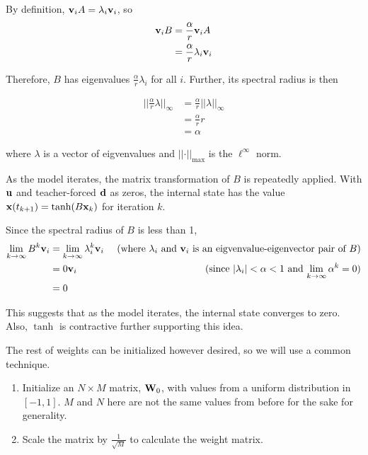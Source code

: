\documentclass{article}
\begin{document}
By definition, $\mathbf{v}_i A = \lambda_i \mathbf{v}_i$, so
\begin{align*}
   \mathbf{v}_i B &= \frac{\alpha}{r} \mathbf{v}_i A \\
   &= \frac{\alpha}{r} \lambda_i \mathbf{v}_i
\end{align*}

Therefore, $B$ has eigenvalues $\frac{\alpha}{r} \lambda_i$ for all $i$.
Further, its spectral radius is then

\begin{align*}
    \vert\vert \frac{\alpha}{r} \lambda \vert\vert_\infty
    &= \frac{\alpha}{r} \vert\vert \lambda \vert\vert_\infty \\
    &= \frac{\alpha}{r} r \\
    &= \alpha
\end{align*}

where $\lambda$ is a vector of eigvenvalues and $\vert \vert \cdot \vert
\vert_\text{max}$ is the $\ell^\infty$ norm.

As the model iterates, the matrix transformation of $B$ is repeatedly
applied. With $\mathbf{u}$ and teacher-forced $\mathbf{d}$ as zeros, the internal state has
the value $\mathbf{x}(t_{k+1}) = \tanh(B \mathbf{x}_k)$ for iteration $k$.

Since the spectral radius of $B$ is less than 1,
\begin{align*}
    \lim_{k \to \infty}B^k \mathbf{v}_i &= \lim_{k \to \infty} \lambda_i^k \mathbf{v}_i & \text{ (where $\lambda_i$ and $\mathbf{v}_i$ is an eigvenvalue-eigenvector pair of $B$)} \\
    &= 0 \mathbf{v}_i & \text{ (since $\vert\lambda_i\vert < \alpha < 1$ and $\lim_{k \to \infty}\alpha^k = 0$)} \\
    &= 0
\end{align*}

This suggests that as the model iterates, the internal state converges to
zero. Also, $\tanh$ is contractive further supporting this idea.

The rest of weights can be initialized however desired, so we will use a
common technique.

\begin{enumerate}
    \item Initialize an $N \times M$ matrix, $\mathbf{W}_0$, with values from a 
    uniform distribution in $[-1, 1]$. $M$ and $N$ here are not the 
    same values from before for the sake for generality. 
    \item Scale the matrix by $\frac{1}{\sqrt{M}}$ to calculate the weight matrix.
\end{enumerate}
\end{document}
